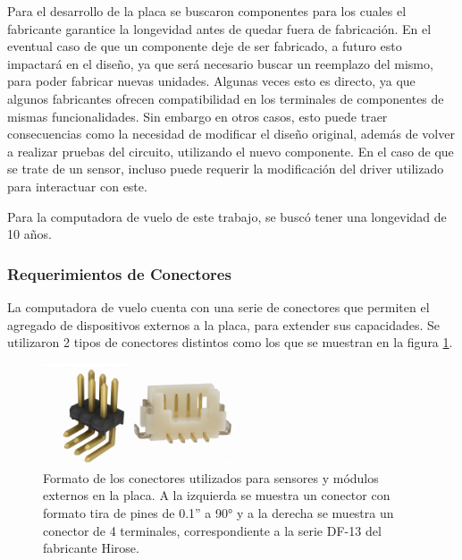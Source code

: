 
Para el desarrollo de la placa se buscaron componentes para los cuales el fabricante garantice la longevidad antes de quedar fuera de fabricación. En el eventual caso de que un componente deje de ser fabricado, a futuro esto impactará en el diseño, ya que será necesario buscar un reemplazo del mismo, para poder fabricar nuevas unidades. Algunas veces esto es directo, ya que algunos fabricantes ofrecen compatibilidad en los terminales de componentes de mismas funcionalidades. Sin embargo en otros casos, esto puede traer consecuencias como la necesidad de modificar el diseño original, además de volver a realizar pruebas del circuito, utilizando el nuevo componente. En el caso de que se trate de un sensor, incluso puede requerir la modificación del driver utilizado para interactuar con este.

Para la computadora de vuelo de este trabajo, se buscó tener una longevidad de 10 años.


\subsubsection{Requerimientos de Conectores}


La computadora de vuelo cuenta con una serie de conectores que permiten el agregado de dispositivos externos a la placa, para extender sus capacidades. Se utilizaron 2 tipos de conectores distintos como los que se muestran en la figura \ref{fig:conectores_dupon_df_13}.

\begin{figure}[htb]
    \centering
    \includegraphics[width=0.5\textwidth]{img/conectores_dupon_df_13.png}
    \caption{Formato de los conectores utilizados para sensores y módulos externos en la placa. A la izquierda se muestra un conector con formato tira de pines de 0.1” a 90° y a la derecha se muestra un conector de 4 terminales, correspondiente a la serie DF-13 del fabricante Hirose.}
    \label{fig:conectores_dupon_df_13}
\end{figure}


